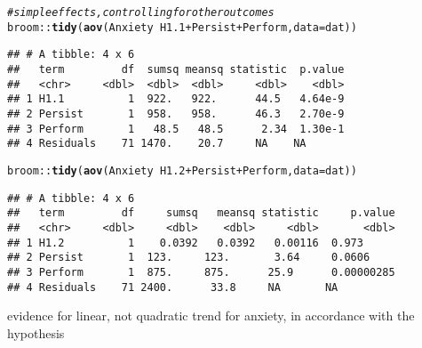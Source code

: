 \documentclass{article}\usepackage[]{graphicx}\usepackage[]{color}
\makeatletter
\newcommand{\hlcom}[1]{\textcolor[rgb]{0.678,0.584,0.686}{\textit{#1}}}%
\newcommand{\hlopt}[1]{\textcolor[rgb]{0,0,0}{#1}}%
\newcommand{\hlstd}[1]{\textcolor[rgb]{0.345,0.345,0.345}{#1}}%
\newcommand{\hlkwc}[1]{\textcolor[rgb]{0.333,0.667,0.333}{#1}}%
\newcommand{\hlkwd}[1]{\textcolor[rgb]{0.737,0.353,0.396}{\textbf{#1}}}%
\newenvironment{kframe}{%
 \def\at@end@of@kframe{}%
 \ifinner\ifhmode%
  \def\at@end@of@kframe{\end{minipage}}%
  \begin{minipage}{\columnwidth}%
 \fi\fi%
 \def\FrameCommand##1{\hskip\@totalleftmargin \hskip-\fboxsep
 \colorbox{shadecolor}{##1}\hskip-\fboxsep
     \hskip-\linewidth \hskip-\@totalleftmargin \hskip\columnwidth}%
 \MakeFramed {\advance\hsize-\width
   \@totalleftmargin\z@ \linewidth\hsize
   \@setminipage}}%
 {\par\unskip\endMakeFramed%
 \at@end@of@kframe}
\newenvironment{knitrout}{}{} %
\makeatother
\begin{document}
\begin{knitrout}
\color{fgcolor}\begin{kframe}
\begin{alltt}
\hlcom{# simple effects, controlling for other outcomes}
\hlstd{broom}\hlopt{::}\hlkwd{tidy}\hlstd{(}\hlkwd{aov}\hlstd{(Anxiety} \hlopt{~} \hlstd{H1.1} \hlopt{+} \hlstd{Persist} \hlopt{+} \hlstd{Perform,} \hlkwc{data} \hlstd{= dat))}
\end{alltt}
\begin{verbatim}
## # A tibble: 4 x 6
##   term         df  sumsq meansq statistic  p.value
##   <chr>     <dbl>  <dbl>  <dbl>     <dbl>    <dbl>
## 1 H1.1          1  922.   922.      44.5   4.64e-9
## 2 Persist       1  958.   958.      46.3   2.70e-9
## 3 Perform       1   48.5   48.5      2.34  1.30e-1
## 4 Residuals    71 1470.    20.7     NA    NA
\end{verbatim}
\begin{alltt}
\hlstd{broom}\hlopt{::}\hlkwd{tidy}\hlstd{(}\hlkwd{aov}\hlstd{(Anxiety} \hlopt{~} \hlstd{H1.2} \hlopt{+} \hlstd{Persist} \hlopt{+} \hlstd{Perform,} \hlkwc{data} \hlstd{= dat))}
\end{alltt}
\begin{verbatim}
## # A tibble: 4 x 6
##   term         df     sumsq   meansq statistic     p.value
##   <chr>     <dbl>     <dbl>    <dbl>     <dbl>       <dbl>
## 1 H1.2          1    0.0392   0.0392   0.00116  0.973     
## 2 Persist       1  123.     123.       3.64     0.0606    
## 3 Perform       1  875.     875.      25.9      0.00000285
## 4 Residuals    71 2400.      33.8     NA       NA
\end{verbatim}
\end{kframe}
\end{knitrout}

evidence for linear, not quadratic trend for anxiety, in accordance with the hypothesis
\end{document}
